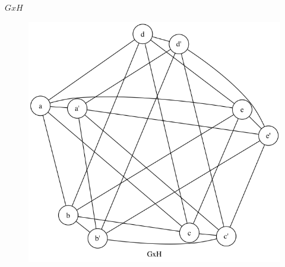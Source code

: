 \begin{enumerate}[(a)]
\begin{figure}[H]
    \end{figure}
    $GxH$
    \begin{figure}[H]
    \centering
    \includegraphics[scale=0.5]{115/115aGH2.png}
    \end{figure}



\end{enumerate}
